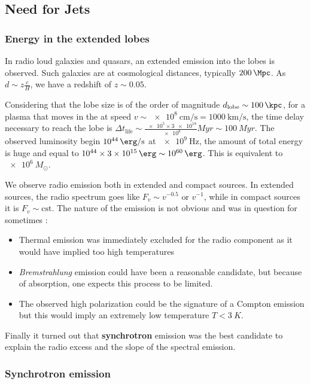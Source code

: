 \documentclass[10pt,a4paper,english]{article}
\begin{document}
\subsection{Need for Jets}

\subsubsection{Energy in the extended lobes}

In radio loud galaxies and quasars, an extended emission into the lobes is
observed. Such galaxies are at cosmological distances, typically
$\SI{200}{\Mpc}$. As $d\sim z\frac{c }{H}$, we have a redshift of $z\sim 0.05$.

Considering that the lobe size is of the order of magnitude
$d_\mathrm{lobe}\sim \SI{100}{\kpc}$, for a plasma that moves in the at speed
$v\sim \SI{e8}{\cm\per\s} = \SI{1000}{\km\per\s}$, the time delay necessary to
reach the lobe is $\Delta t_\mathrm{life} \sim
\frac{\num{e5}\times\num{3e18}}{\num{e8}} \si{Myr} \sim \SI{100}{Myr}$. The
observed luminosity begin $\SI{e44}{\erg\per\s}$ at $\SI{e9}{\Hz}$, the amount
of total energy is huge and equal to $\num{e44}\times\SI{3e15}{\erg} \sim
\SI{e60}{\erg}$. This is equivalent to $\SI{e6}{M_\odot}$.

We observe radio emission both in extended and compact sources. In extended
sources, the radio spectrum goes like $F_v \sim v^{-0.5} \textrm{ or } v^{-1}$,
while in compact sources it is $F_v \sim \mathrm{cst}$. The nature of the
emission is not obvious and was in question for sometimes :
\begin{itemize}
    \item Thermal emission was immediately excluded for the radio component as
          it would have implied too high temperatures
    \item \emph{Bremstrahlung} emission could have been a reasonable candidate,
          but because of absorption, one expects this process to be limited.
    \item The observed high polarization could be the signature of a Compton
          emission but this would imply an extremely low temperature $T <
          \SI{3}{K}$.
\end{itemize}

Finally it turned out that \textbf{synchrotron} emission was the best candidate
to explain the radio excess and the slope of the spectral emission.

\subsubsection{Synchrotron emission}
\end{document}

